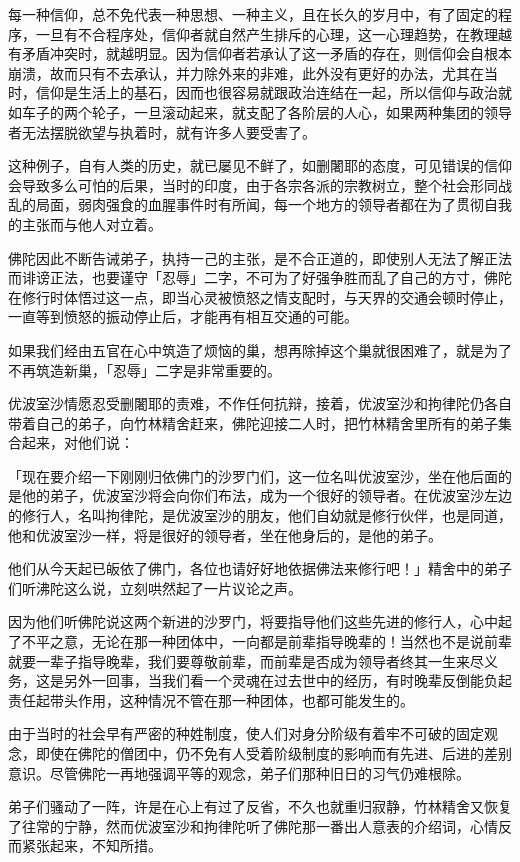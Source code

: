 \documentclass[twoside,openany]{book}
\begin{document}
每一种信仰，总不免代表一种思想、一种主义，且在长久的岁月中，有了固定的程序，一旦有不合程序处，信仰者就自然产生排斥的心理，这一心理趋势，在教理越有矛盾冲突时，就越明显。因为信仰者若承认了这一矛盾的存在，则信仰会自根本崩溃，故而只有不去承认，并力除外来的非难，此外没有更好的办法，尤其在当时，信仰是生活上的基石，因而也很容易就跟政治连结在一起，所以信仰与政治就如车子的两个轮子，一旦滚动起来，就支配了各阶层的人心，如果两种集团的领导者无法摆脱欲望与执着时，就有许多人要受害了。

这种例子，自有人类的历史，就已屡见不鲜了，如删闍耶的态度，可见错误的信仰会导致多么可怕的后果，当时的印度，由于各宗各派的宗教树立，整个社会形同战乱的局面，弱肉强食的血腥事件时有所闻，每一个地方的领导者都在为了贯彻自我的主张而与他人对立着。

佛陀因此不断告诫弟子，执持一己的主张，是不合正道的，即使别人无法了解正法而诽谤正法，也要谨守「忍辱」二字，不可为了好强争胜而乱了自己的方寸，佛陀在修行时体悟过这一点，即当心灵被愤怒之情支配时，与天界的交通会顿时停止，一直等到愤怒的振动停止后，才能再有相互交通的可能。

如果我们经由五官在心中筑造了烦恼的巢，想再除掉这个巢就很困难了，就是为了不再筑造新巢，「忍辱」二字是非常重要的。

优波室沙情愿忍受删闍耶的责难，不作任何抗辩，接着，优波室沙和拘律陀仍各自带着自己的弟子，向竹林精舍赶来，佛陀迎接二人时，把竹林精舍里所有的弟子集合起来，对他们说：

「现在要介绍一下刚刚归依佛门的沙罗门们，这一位名叫优波室沙，坐在他后面的是他的弟子，优波室沙将会向你们布法，成为一个很好的领导者。在优波室沙左边的修行人，名叫拘律陀，是优波室沙的朋友，他们自幼就是修行伙伴，也是同道，他和优波室沙一样，将是很好的领导者，坐在他身后的，是他的弟子。

他们从今天起已皈依了佛门，各位也请好好地依据佛法来修行吧！」精舍中的弟子们听沸陀这么说，立刻哄然起了一片议论之声。

因为他们听佛陀说这两个新进的沙罗门，将要指导他们这些先进的修行人，心中起了不平之意，无论在那一种团体中，一向都是前辈指导晚辈的！当然也不是说前辈就要一辈子指导晚辈，我们要尊敬前辈，而前辈是否成为领导者终其一生来尽义务，这是另外一回事，当我们看一个灵魂在过去世中的经历，有时晚辈反倒能负起责任起带头作用，这种情况不管在那一种团体，也都可能发生的。

由于当时的社会早有严密的种姓制度，使人们对身分阶级有着牢不可破的固定观念，即使在佛陀的僧团中，仍不免有人受着阶级制度的影响而有先进、后进的差别意识。尽管佛陀一再地强调平等的观念，弟子们那种旧日的习气仍难根除。

弟子们骚动了一阵，许是在心上有过了反省，不久也就重归寂静，竹林精舍又恢复了往常的宁静，然而优波室沙和拘律陀听了佛陀那一番出人意表的介绍词，心情反而紧张起来，不知所措。
\end{document}
